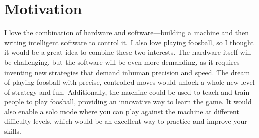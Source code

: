 \section{Motivation}\label{sec:motivation}
I love the combination of hardware and software—building a machine and then writing intelligent software to control it.
I also love playing foosball, so I thought it would be a great idea to combine these two interests.
The hardware itself will be challenging, but the software will be even more demanding, as it requires inventing new strategies that demand inhuman precision and speed.
The dream of playing foosball with precise, controlled moves would unlock a whole new level of strategy and fun.
Additionally, the machine could be used to teach and train people to play foosball, providing an innovative way to learn the game.
It would also enable a solo mode where you can play against the machine at different difficulty levels, which would be an excellent way to practice and improve your skills.
